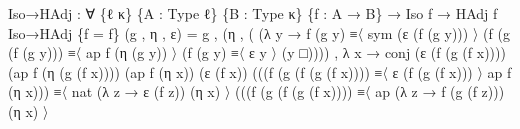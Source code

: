 \documentclass[
  11pt,
  oneside,
  article]{memoir}
\newenvironment{Shaded}{}{}
\newcommand{\NormalTok}[1]{#1}
\newcommand{\OtherTok}[1]{\textcolor[rgb]{0.00,0.44,0.13}{#1}}
\theoremstyle{definition}
\theoremstyle{plain}
\newcommand{\0}{\textsf{0}}
\newcommand{\1}{\tn{\textsf{1}}}
\begin{document}
\begin{Shaded}
\begin{Highlighting}[]
\NormalTok{Iso→HAdj }\OtherTok{:} \OtherTok{∀} \OtherTok{\{}\NormalTok{ℓ κ}\OtherTok{\}} \OtherTok{\{}\NormalTok{A }\OtherTok{:}\NormalTok{ Type ℓ}\OtherTok{\}} \OtherTok{\{}\NormalTok{B }\OtherTok{:}\NormalTok{ Type κ}\OtherTok{\}} \OtherTok{\{}\NormalTok{f }\OtherTok{:}\NormalTok{ A }\OtherTok{→}\NormalTok{ B}\OtherTok{\}}
           \OtherTok{→}\NormalTok{ Iso f }\OtherTok{→}\NormalTok{ HAdj f}
\NormalTok{Iso→HAdj }\OtherTok{\{}\NormalTok{f }\OtherTok{=}\NormalTok{ f}\OtherTok{\}} \OtherTok{(}\NormalTok{g , η , ε}\OtherTok{)} \OtherTok{=}
\NormalTok{    g , }\OtherTok{(}\NormalTok{η }
\NormalTok{    , }\OtherTok{(} \OtherTok{(λ}\NormalTok{ y }\OtherTok{→} 
\NormalTok{           f }\OtherTok{(}\NormalTok{g y}\OtherTok{)}\NormalTok{         ≡〈 sym }\OtherTok{(}\NormalTok{ε }\OtherTok{(}\NormalTok{f }\OtherTok{(}\NormalTok{g y}\OtherTok{)))}\NormalTok{ 〉 }
          \OtherTok{(}\NormalTok{f }\OtherTok{(}\NormalTok{g }\OtherTok{(}\NormalTok{f }\OtherTok{(}\NormalTok{g y}\OtherTok{)))}\NormalTok{ ≡〈 ap f }\OtherTok{(}\NormalTok{η }\OtherTok{(}\NormalTok{g y}\OtherTok{))}\NormalTok{ 〉 }
          \OtherTok{(}\NormalTok{f }\OtherTok{(}\NormalTok{g y}\OtherTok{)}\NormalTok{         ≡〈 ε y 〉 }
          \OtherTok{(}\NormalTok{y               □}\OtherTok{))))} 
\NormalTok{      , }\OtherTok{λ}\NormalTok{ x }
          \OtherTok{→}\NormalTok{ conj }\OtherTok{(}\NormalTok{ε }\OtherTok{(}\NormalTok{f }\OtherTok{(}\NormalTok{g }\OtherTok{(}\NormalTok{f x}\OtherTok{))))} \OtherTok{(}\NormalTok{ap f }\OtherTok{(}\NormalTok{η }\OtherTok{(}\NormalTok{g }\OtherTok{(}\NormalTok{f x}\OtherTok{))))} 
              \OtherTok{(}\NormalTok{ap f }\OtherTok{(}\NormalTok{η x}\OtherTok{))} \OtherTok{(}\NormalTok{ε }\OtherTok{(}\NormalTok{f x}\OtherTok{))} 
              \OtherTok{(((}\NormalTok{f }\OtherTok{(}\NormalTok{g }\OtherTok{(}\NormalTok{f }\OtherTok{(}\NormalTok{g }\OtherTok{(}\NormalTok{f x}\OtherTok{))))}\NormalTok{ ≡〈 ε }\OtherTok{(}\NormalTok{f }\OtherTok{(}\NormalTok{g }\OtherTok{(}\NormalTok{f x}\OtherTok{)))}\NormalTok{ 〉 ap f }\OtherTok{(}\NormalTok{η x}\OtherTok{)))} 
\NormalTok{              ≡〈 nat }\OtherTok{(λ}\NormalTok{ z }\OtherTok{→}\NormalTok{ ε }\OtherTok{(}\NormalTok{f z}\OtherTok{))} \OtherTok{(}\NormalTok{η x}\OtherTok{)}\NormalTok{ 〉 }
              \OtherTok{(((}\NormalTok{f }\OtherTok{(}\NormalTok{g }\OtherTok{(}\NormalTok{f }\OtherTok{(}\NormalTok{g }\OtherTok{(}\NormalTok{f x}\OtherTok{))))} 
\NormalTok{                ≡〈 ap }\OtherTok{(λ}\NormalTok{ z }\OtherTok{→}\NormalTok{ f }\OtherTok{(}\NormalTok{g }\OtherTok{(}\NormalTok{f z}\OtherTok{)))} \OtherTok{(}\NormalTok{η x}\OtherTok{)}\NormalTok{ 〉 }

\end{Highlighting}
\end{Shaded}
\end{document}

